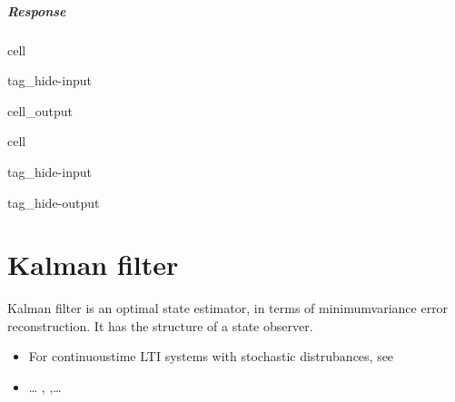 \documentclass[letterpaper,10pt,english]{jupyterBook}
\begin{document}
\subparagraph{Response}
\label{\detokenize{ch/control/optimal-control-ref-tracking-example:id2}}
\begin{sphinxuseclass}{cell}
\begin{sphinxuseclass}{tag_hide-input}\begin{sphinxVerbatimOutput}

\begin{sphinxuseclass}{cell_output}
\noindent{}

\noindent{}

\end{sphinxuseclass}\end{sphinxVerbatimOutput}

\end{sphinxuseclass}
\end{sphinxuseclass}
\begin{sphinxuseclass}{cell}
\begin{sphinxuseclass}{tag_hide-input}
\begin{sphinxuseclass}{tag_hide-output}
\end{sphinxuseclass}
\end{sphinxuseclass}
\end{sphinxuseclass}
\sphinxstepscope


\section{Kalman filter}
\label{\detokenize{ch/control/kalman:kalman-filter}}\label{\detokenize{ch/control/kalman:control-kalman}}\label{\detokenize{ch/control/kalman::doc}}
\sphinxAtStartPar
Kalman filter is an optimal state estimator, in terms of minimum\sphinxhyphen{}variance error reconstruction. It has the structure of a state observer.
\begin{itemize}
\item {} 
\sphinxAtStartPar
For continuous\sphinxhyphen{}time LTI systems with stochastic distrubances, see {\hyperref[\detokenize{ch/control/optimal-control-observer-stochastic:control-optimal-observer-stochastic}]{}}

\item {} 
\sphinxAtStartPar
… , ,…

\end{itemize}
\end{document}
